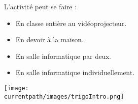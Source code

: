 \begin{changemargin}{-10mm}{-10mm}
    \begin{activite}
        \begin{minipage}{0.6\linewidth}
            \begin{remarque}
                L'activité peut se faire :
                \begin{itemize}
                    \item En classe entière au vidéoprojecteur.
                    \item En devoir à la maison.
                    \item En salle informatique par deux.
                    \item En salle informatique individuellement.
                \end{itemize}
            \end{remarque}
        \end{minipage}
        \begin{minipage}{0.35\linewidth}
            \begin{center}
                \texttt{[image: \\currentpath/images/trigoIntro.png]}
            \end{center}
        \end{minipage}
        \begin{center}
            {\Huge {}}    
            

\end{center}
\end{activite}
\end{changemargin}
